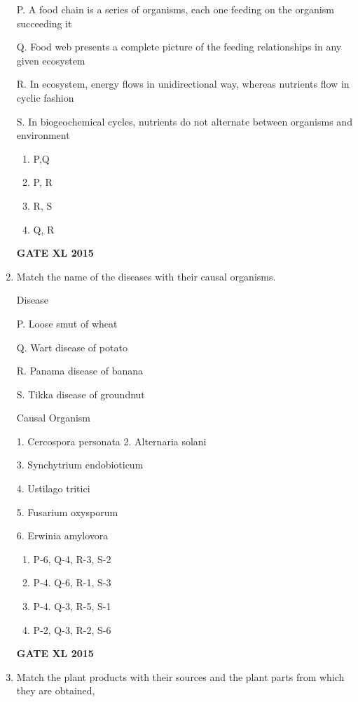 \documentclass[journal,12pt,onecolumn]{IEEEtran}
\begin{document}
\begin{enumerate}
P. A food chain is a series of organisms, each one feeding on the organism succeeding it

Q. Food web presents a complete picture of the feeding relationships in any given ecosystem

R. In ecosystem, energy flows in unidirectional way, whereas nutrients flow in cyclic fashion

S. In biogeochemical cycles, nutrients do not alternate between organisms and environment
    \begin{enumerate}
            \item P,Q
	    \item P, R
	    \item R, S
            \item Q, R
    \end{enumerate}
\begin{flushright}\textbf{GATE XL 2015}\end{flushright}
\item Match the name of the diseases with their causal organisms.

\begin{minipage}{0.5\textwidth}
	\begin{flushleft}
Disease

P. Loose smut of wheat

Q. Wart disease of potato

R. Panama disease of banana

S. Tikka disease of groundnut

	\end{flushleft}
\end{minipage}
\begin{minipage}{0.5\textwidth}
	\begin{flushleft}
Causal Organism

1. Cercospora personata 2. Alternaria solani

3. Synchytrium endobioticum

4. Ustilago tritici

5. Fusarium oxysporum

6. Erwinia amylovora
	\end{flushleft}
\end{minipage}

    \begin{enumerate}
            \item P-6, Q-4, R-3, S-2
	    \item P-4. Q-6, R-1, S-3
	    \item P-4. Q-3, R-5, S-1
            \item P-2, Q-3, R-2, S-6
    \end{enumerate}
\begin{flushright}\textbf{GATE XL 2015}\end{flushright}
\item Match the plant products with their sources and the plant parts from which they are obtained,


\end{enumerate}
\end{document}
